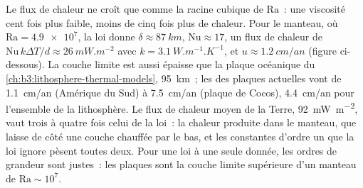 Le flux de chaleur ne croît que comme la racine cubique de $\mathrm{Ra}$~: une viscosité cent fois
plus faible, moins de cinq fois plus de chaleur.
Pour le manteau, où $\mathrm{Ra} = \num{4.9e7}$, la loi donne $\delta \approx \qty{87}{km}$,
$\mathrm{Nu} \approx 17$, un flux de chaleur de $\mathrm{Nu}\,k\Delta T/d \approx
\qty{26}{mW.m^{-2}}$ avec $k = \qty{3.1}{W.m^{-1}.K^{-1}}$, et $u \approx
\qty{1.2}{cm/an}$ (figure ci-dessous). La couche limite est aussi épaisse que la
plaque océanique du \cref{ch:b3:lithosphere-thermal-models}, \qty{95}{km}~; les
 des plaques actuelles vont de \qty{1.1}{cm/an} (Amérique du
Sud) à \qty{7.5}{cm/an} (plaque de Cocos), \qty{4.4}{cm/an} pour l'ensemble de la
lithosphère. Le flux de chaleur moyen de la Terre, \qty{92}{mW.m^{-2}}, vaut trois à quatre
fois celui de la loi~: la chaleur produite dans le manteau, que laisse de côté une couche
chauffée par le bas, et les constantes d'ordre un que la loi
ignore pèsent toutes deux. Pour une loi à une seule donnée, les ordres de grandeur
sont justes~: les plaques sont la couche limite supérieure d'un manteau de $\mathrm{Ra}
\sim 10^7$.

